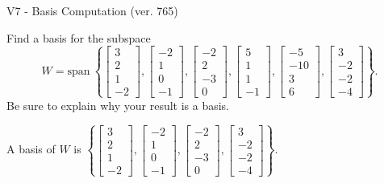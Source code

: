 \begin{exercise}
  \begin{exerciseTitle}V7 - Basis Computation (ver. 765)\end{exerciseTitle}
  \begin{exerciseStatement}
    Find a basis for the subspace 
\[W=\mathrm{span}\ \left\{\left[\begin{array}{r}
3 \\
2 \\
1 \\
-2
\end{array}\right] , \left[\begin{array}{r}
-2 \\
1 \\
0 \\
-1
\end{array}\right] , \left[\begin{array}{r}
-2 \\
2 \\
-3 \\
0
\end{array}\right] , \left[\begin{array}{r}
5 \\
1 \\
1 \\
-1
\end{array}\right] , \left[\begin{array}{r}
-5 \\
-10 \\
3 \\
6
\end{array}\right] , \left[\begin{array}{r}
3 \\
-2 \\
-2 \\
-4
\end{array}\right]\right\}.\]
 Be sure to explain why your result is a basis.


  \end{exerciseStatement}
  \begin{exerciseAnswer}
   A basis of \(W\) is  \(\left\{\left[\begin{array}{r}
3 \\
2 \\
1 \\
-2
\end{array}\right] , \left[\begin{array}{r}
-2 \\
1 \\
0 \\
-1
\end{array}\right] , \left[\begin{array}{r}
-2 \\
2 \\
-3 \\
0
\end{array}\right] , \left[\begin{array}{r}
3 \\
-2 \\
-2 \\
-4
\end{array}\right]\right\}\).
  


  \end{exerciseAnswer}
\end{exercise}
